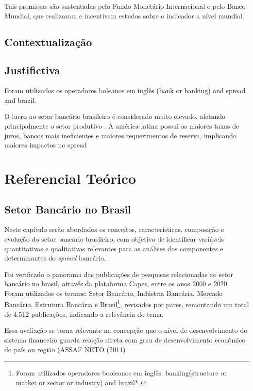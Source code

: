 \documentclass[12pt,openright,oneside,a4paper,chapter=TITLE,section=TITLE,subsection=Title,english,french,spanish,portugues,sumario=tradicional]{04-class-files/abntex2}
\begin{document}
Tais premissas são sustentadas pelo Fundo Monetário Internacional e pelo Banco Mundial, que realizaram e incentivam estudos sobre o indicador a nível mundial.

\section{Contextualização}

\section{Justifictiva}

Foram utilizados os operadores boleanos em inglês (bank or banking) and
spread and brazil.

O lucro no setor bancário brasileiro é considerado muito elevado,
afetando principalmente o setor produtivo \cite{dantas:2012}. A américa latina
possui as maiores taxas de juros, bancos mais ineficientes e maiores
requerimentos de reserva, implicando maiores impactos no spread \cite{dantas:2012}

\textual
\pagestyle{simple}

\chapter{Referencial Teórico}

\section{Setor Bancário no Brasil}

Neste capítulo serão abordados os conceitos, características, composição e
evolução do setor bancário brasileiro, com objetivo de identificar variáveis
quantitativas e qualitativas relevantes para as análises dos componentes e
determinantes do \emph{spread} bancário.

Foi verificado o panorama das publicações de pesquisas relacionadas ao setor
bancário no brasil, através da plataforma Capes, entre os anos 2000 e 2020.
Foram utilizados os termos: Setor Bancário, Indústria Bancária, Mercado
Bancário, Estrutura Bancária e Brasil\footnote{Foram utilizados operadores
booleanos em inglês: banking(structure or market or sector or industry) and
brazil*.}, revisados por pares, remontando um total de 4.512 publicações,
indicando a relevância do tema.

Essa avaliação se torna relevante na concepção que o nível de desenvolvimento
do sistema financeiro guarda relação direta com grau de desenvolvimento
econômico do país ou região (ASSAF NETO (2014)
\end{document}
